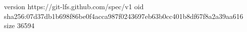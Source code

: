 version https://git-lfs.github.com/spec/v1
oid sha256:07d37db1b698f86be0f4acca987f0243697eb63b0cc401b8df67f8a2a39aa616
size 36594
